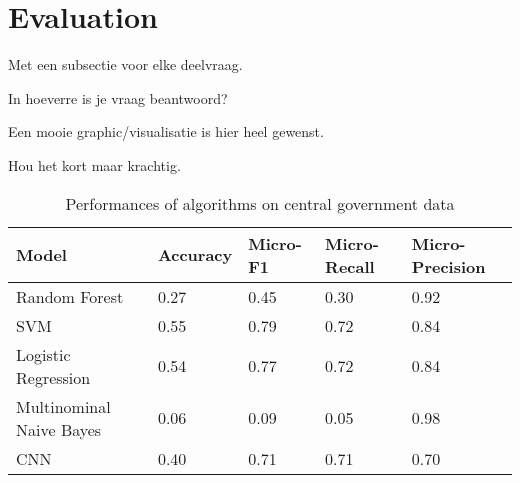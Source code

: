 \section{Evaluation}
\label{sec:eva}

Met een subsectie voor elke deelvraag.

In hoeverre is je vraag beantwoord?

Een mooie graphic/visualisatie is hier heel gewenst.

Hou het kort maar krachtig.


\begin{table}[]
\centering
\caption{Performances of algorithms on central government data}
\label{my-label}
\begin{tabular}{@{}lllll@{}}
\toprule
\textbf{Model}      		& \textbf{Accuracy} & \textbf{Micro-F1} & \textbf{Micro-Recall}   & \textbf{Micro-Precision} \\ \midrule
Random Forest      		&  0.27                 	  & 0.45                  	  & 0.30                   		& 0.92                  \\
SVM                 		&  0.55                 	  & 0.79                  	  & 0.72                     	& 0.84                  \\
Logistic Regression	 	&  0.54          	  & 0.77                 	  & 0.72                  		& 0.84                  \\
Multinominal Naive Bayes 	&  0.06	       	  & 0.09                	  & 0.05               	 	& 0.98                  \\
CNN                 		&  0.40                 	  & 0.71                  	  & 0.71                  		& 0.70                  \\ \bottomrule
\end{tabular}
\end{table}
